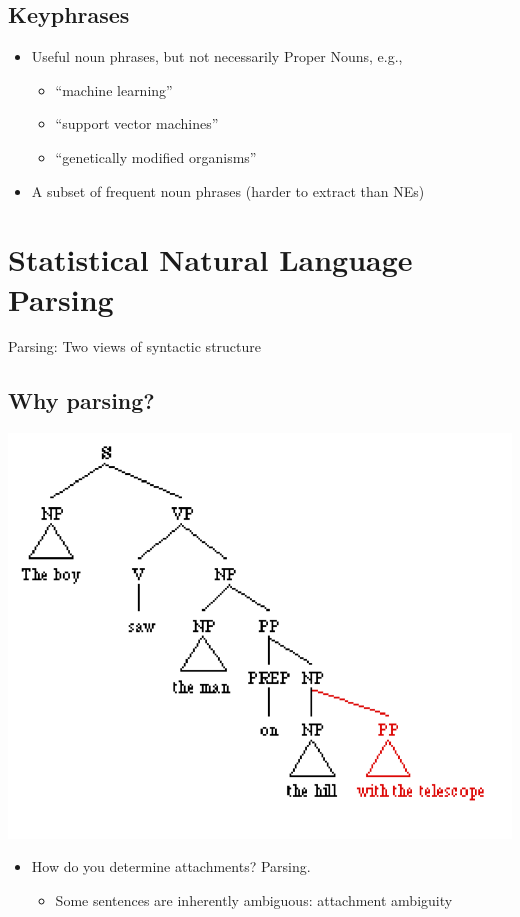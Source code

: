 \documentclass[11pt]{article}
\theoremstyle{definition}
\begin{document}
\subsection{Keyphrases}
\begin{itemize}
  \item Useful noun phrases, but not necessarily Proper Nouns, e.g.,
  \begin{itemize}
    \item “machine learning”
    \item “support vector machines”
    \item “genetically modified organisms”
  \end{itemize}
  \item A subset of frequent noun phrases (harder to extract than NEs)
\end{itemize}

\section{Statistical Natural
Language Parsing}
Parsing: Two views of
syntactic structure

\subsection{Why parsing?}
\includegraphics[width = \textwidth/2]{2.png}
\begin{itemize}
  \item How do you determine attachments? Parsing.
  \begin{itemize}
    \item Some sentences are inherently ambiguous: attachment ambiguity
  \end{itemize}
\end{itemize}
\end{document}
